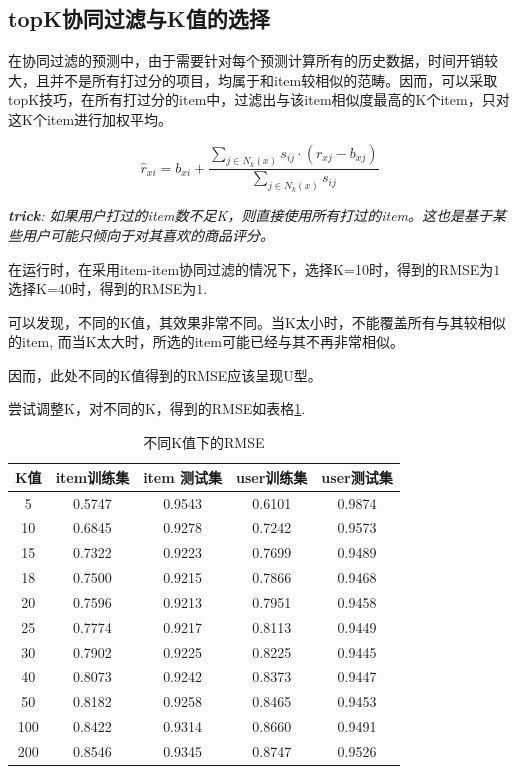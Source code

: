 \documentclass[utf8, a4paper, 11pt, onecolumn]{ctexart}
\begin{document}
\begin{spacing}{1.3}
\subsection{topK协同过滤与K值的选择}

在协同过滤的预测中，由于需要针对每个预测计算所有的历史数据，时间开销较大，且并不是所有打过分的项目，均属于和item较相似的范畴。因而，可以采取topK技巧，在所有打过分的item中，过滤出与该item相似度最高的K个item，只对这K个item进行加权平均。

\[\hat{r}_{xi} = b_{xi}  + \frac{\sum_{j \in N_k(x)} s_{ij} \cdot (r_{xj} - b_{xj})}{\sum_{j \in N_k(x)} s_{ij}} \]

\textit{\textbf{trick}: 如果用户打过的item数不足K，则直接使用所有打过的item。这也是基于某些用户可能只倾向于对其喜欢的商品评分。}

在运行时，在采用item-item协同过滤的情况下，选择K=10时，得到的RMSE为$1$选择K=40时，得到的RMSE为$1$.

可以发现，不同的K值，其效果非常不同。当K太小时，不能覆盖所有与其较相似的item, 而当K太大时，所选的item可能已经与其不再非常相似。

因而，此处不同的K值得到的RMSE应该呈现U型。

尝试调整K，对不同的K，得到的RMSE如表格\ref{k-table}.

\begin{table}
	\centering
	\begin{tabular}{| c | c | c | c | c |}
		\hline
		\textbf{K值} & item训练集 & item 测试集&user训练集 & user测试集 \\ 
		\hline
		5 & 0.5747 	& 0.9543 & 0.6101 &	0.9874 \\ 
		\hline
		10 & 0.6845 &	0.9278 & 0.7242 &	0.9573 \\
		\hline
		15 & 0.7322 &	0.9223 & 0.7699 &	0.9489 \\
		\hline
		18 & 0.7500 &	0.9215 &	0.7866 &	0.9468 \\
		\hline
		20 & 0.7596 &	0.9213 & 0.7951 &	0.9458 \\
		\hline
		25 & 0.7774 &	0.9217 &	0.8113 &	0.9449 \\ 
		\hline
		30 & 0.7902 &	0.9225 &	0.8225 &	0.9445 \\
		\hline
		40 &0.8073 &	0.9242 &	0.8373 &	0.9447 \\
		\hline
		50 & 0.8182 &	0.9258 &	0.8465 &	0.9453 \\
		\hline
		100 & 0.8422 & 0.9314 &	0.8660 &	0.9491 \\
		\hline
		200 & 0.8546 &	0.9345 &	0.8747 &	0.9526 \\
		\hline 
	\end{tabular}
	\caption{不同K值下的RMSE}
	\label{k-table}
\end{table}


\end{spacing}
\end{document}
